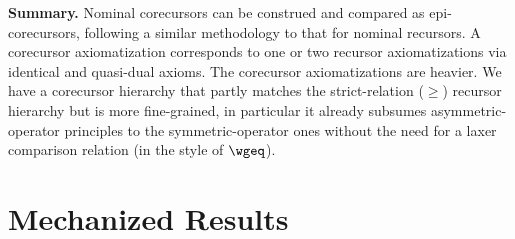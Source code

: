 \medskip
\noindent 
\textbf{Summary.} %
%
Nominal corecursors can be construed and compared as epi-corecursors, following a similar methodology to that %
for nominal recursors. A corecursor axiomatization 
corresponds to one or two recursor axiomatizations via identical and quasi-dual axioms. %
%
The corecursor axiomatizations are %
heavier.  
%
%
%
We have a corecursor hierarchy that partly matches the strict-relation ($\geq$) recursor hierarchy %
but is more fine-grained, in particular it already subsumes asymmetric-operator principles to the symmetric-operator ones without the need for a laxer comparison relation (in the style of $\wgeq$). 


\section{Mechanized Results}
\label{sec-mechResults}

